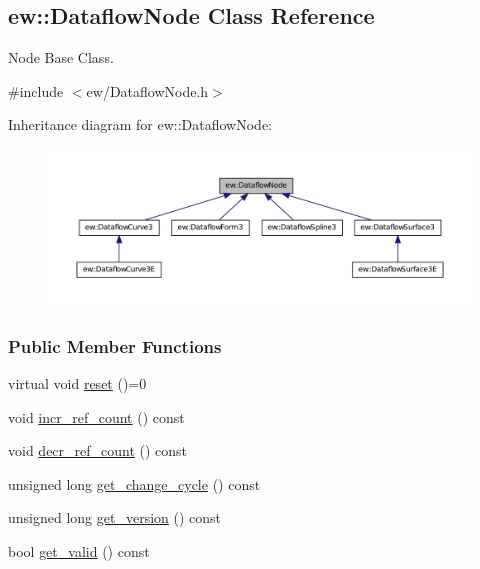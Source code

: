 \hypertarget{classew_1_1DataflowNode}{
\subsection{ew::DataflowNode Class Reference}
\label{classew_1_1DataflowNode}
}


Node Base Class.  




{\ttfamily \#include $<$ew/DataflowNode.h$>$}



Inheritance diagram for ew::DataflowNode:
\nopagebreak
\begin{figure}[H]
\begin{center}
\leavevmode
\includegraphics[width=400pt]{classew_1_1DataflowNode__inherit__graph}
\end{center}
\end{figure}
\subsubsection*{Public Member Functions}
\begin{DoxyCompactItemize}
\item 
virtual void \hyperlink{classew_1_1DataflowNode_afb722a0a8129fb026e9ab82c638dda54}{reset} ()=0
\item 
void \hyperlink{classew_1_1DataflowNode_a412a930ede1955b09dcc708dd78469a5}{incr\_\-ref\_\-count} () const 
\item 
void \hyperlink{classew_1_1DataflowNode_a7ee43d6c11ea87911ce0dbc16df0722a}{decr\_\-ref\_\-count} () const 
\item 
unsigned long \hyperlink{classew_1_1DataflowNode_a80553efd99a2247c70b179600cc84fc5}{get\_\-change\_\-cycle} () const 
\item 
unsigned long \hyperlink{classew_1_1DataflowNode_a748037041473e788688117cd99b095c2}{get\_\-version} () const 
\item 
bool \hyperlink{classew_1_1DataflowNode_ab107e9b827f2ce8e9875fff5f90723b0}{get\_\-valid} () const 
\end{DoxyCompactItemize}
